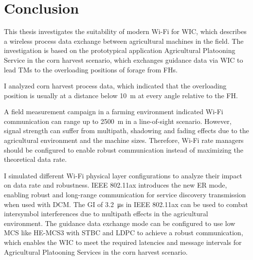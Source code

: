 \chapter{Conclusion}
\acresetall
\begin{comment}
    \begin{itemize}
    \item summarize again what your paper did, but now emphasize more the results, and comparisons
    \item write conclusions that can be drawn from the results found and the discussion presented in the paper
    \item future work (be very brief, explain what, but not much how, do not speculate about results or impact)
    \item recommended length: one page.
    \end{itemize}
\end{comment}

This thesis investigates the suitability of modern Wi-Fi for \ac{WIC}, which describes a wireless process data exchange between agricultural machines in the field.
The investigation is based on the prototypical application Agricultural Platooning Service in the corn harvest scenario, which exchanges guidance data via \ac{WIC} to lead \ac{TM}s to the overloading positions of forage from \ac{FH}s.

I analyzed corn harvest process data, which indicated that the overloading position is usually at a distance below \SI{10}{\metre} at every angle relative to the \ac{FH}.

A field measurement campaign in a farming environment indicated Wi-Fi communication can range up to \SI{2500}{\metre} in a line-of-sight scenario.
However, signal strength can suffer from multipath, shadowing and fading effects due to the agricultural environment and the machine sizes.
Therefore, Wi-Fi rate managers should be configured to enable robust communication instead of maximizing the theoretical data rate.

I simulated different Wi-Fi physical layer configurations to analyze their impact on data rate and robustness.
IEEE 802.11ax introduces the new \ac{ER} mode, enabling robust and long-range communication for service discovery transmission when used with \ac{DCM}.
The \ac{GI} of \SI{3.2}{\micro\second} in IEEE 802.11ax can be used to combat intersymbol interferences due to multipath effects in the agricultural environment.
The guidance data exchange mode can be configured to use low \ac{MCS} like \ac{HE}-\ac{MCS}3 with \ac{STBC} and \ac{LDPC} to achieve a robust communication,
which enables the \ac{WIC} to meet the required latencies and message intervals for Agricultural Platooning Services in the corn harvest scenario.

